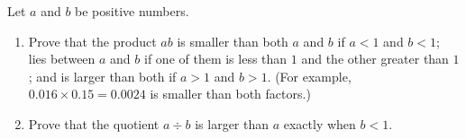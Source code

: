 Let $a$ and $b$ be positive numbers.
\begin{enumerate}
\item[(a)] Prove that the product $ab$ is smaller than both $a$ and $b$ if $a<1$ and $b<1$; lies between $a$ and $b$ if one of them is less than $1$ and the other greater than $1$; and is larger than both if $a>1$ and $b>1$. (For example, $0.016\times0.15=0.0024$ is smaller than both factors.)
\item[(b)] Prove that the quotient $a\div b$ is larger than $a$ exactly when $b<1$.
\end{enumerate}

